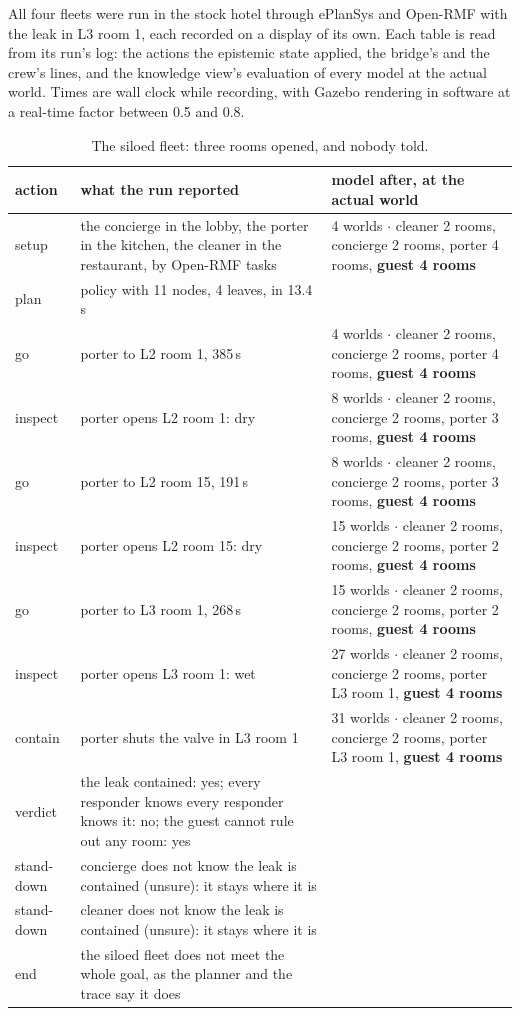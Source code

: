 \documentclass[11pt,a4paper]{article}
\theoremstyle{definition}
\begin{document}
All four fleets were run in the stock hotel through ePlanSys and Open-RMF with
the leak in L3 room 1, each recorded on a display of its own. Each table is read
from its run's log: the actions the epistemic state applied, the bridge's and
the crew's lines, and the knowledge view's evaluation of every model at the
actual world. Times are wall clock while recording, with Gazebo rendering in
software at a real-time factor between 0.5 and 0.8.

\begin{table}[H]
\centering\scriptsize
\begin{tabularx}{\textwidth}{@{}l X X@{}}
\toprule
action & what the run reported & model after, at the actual world \\
\midrule
setup & the concierge in the lobby, the porter in the kitchen, the cleaner in the restaurant, by Open-RMF tasks & 4 worlds $\cdot$ cleaner 2 rooms, concierge 2 rooms, porter 4 rooms, \textbf{guest 4 rooms} \\
plan & policy with 11 nodes, 4 leaves, in 13.4 s &  \\
go & porter to L2 room 1, 385\,s & 4 worlds $\cdot$ cleaner 2 rooms, concierge 2 rooms, porter 4 rooms, \textbf{guest 4 rooms} \\
inspect & porter opens L2 room 1: dry & 8 worlds $\cdot$ cleaner 2 rooms, concierge 2 rooms, porter 3 rooms, \textbf{guest 4 rooms} \\
go & porter to L2 room 15, 191\,s & 8 worlds $\cdot$ cleaner 2 rooms, concierge 2 rooms, porter 3 rooms, \textbf{guest 4 rooms} \\
inspect & porter opens L2 room 15: dry & 15 worlds $\cdot$ cleaner 2 rooms, concierge 2 rooms, porter 2 rooms, \textbf{guest 4 rooms} \\
go & porter to L3 room 1, 268\,s & 15 worlds $\cdot$ cleaner 2 rooms, concierge 2 rooms, porter 2 rooms, \textbf{guest 4 rooms} \\
inspect & porter opens L3 room 1: wet & 27 worlds $\cdot$ cleaner 2 rooms, concierge 2 rooms, porter L3 room 1, \textbf{guest 4 rooms} \\
contain & porter shuts the valve in L3 room 1 & 31 worlds $\cdot$ cleaner 2 rooms, concierge 2 rooms, porter L3 room 1, \textbf{guest 4 rooms} \\
verdict & the leak contained: yes; every responder knows every responder knows it: no; the guest cannot rule out any room: yes &  \\
stand-down & concierge does not know the leak is contained (unsure): it stays where it is &  \\
stand-down & cleaner does not know the leak is contained (unsure): it stays where it is &  \\
end & the siloed fleet does not meet the whole goal, as the planner and the trace say it does &  \\
\bottomrule
\end{tabularx}
\caption{The siloed fleet: three rooms opened, and nobody told.}
\label{tab:run-siloed}
\end{table}
\end{document}
